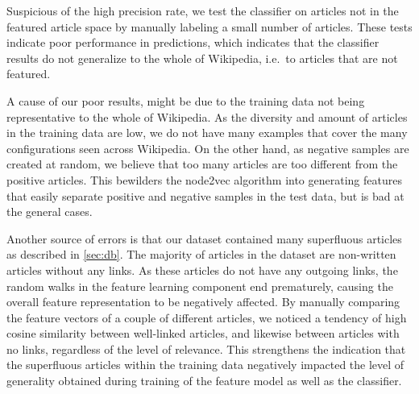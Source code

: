 Suspicious of the high precision rate, we test the classifier on articles not in the featured article space by manually labeling a small number of articles. These tests indicate poor performance in predictions, which indicates that the classifier results do not generalize to the whole of Wikipedia, i.e.\ to articles that are not featured.



A cause of our poor results, might be due to the training data not being representative to the whole of Wikipedia. As the diversity and amount of articles in the training data are low, we do not have many examples that cover the many configurations seen across Wikipedia. On the other hand, as negative samples are created at random, we believe that too many articles are too different from the positive articles. This bewilders the node2vec algorithm into generating features that easily separate positive and negative samples in the test data, but is bad at the general cases.


Another source of errors is that our dataset contained many superfluous articles as described in \cref{sec:db}. The majority of articles in the dataset are non-written articles without any links. As these articles do not have any outgoing links, the random walks in the feature learning component end prematurely, causing the overall feature representation to be negatively affected.
By manually comparing the feature vectors of a couple of different articles, we noticed a tendency of high cosine similarity between well-linked articles, and likewise between articles with no links, regardless of the level of relevance. This strengthens the indication that the superfluous articles within the training data negatively impacted the level of generality obtained during training of the feature model as well as the classifier.


